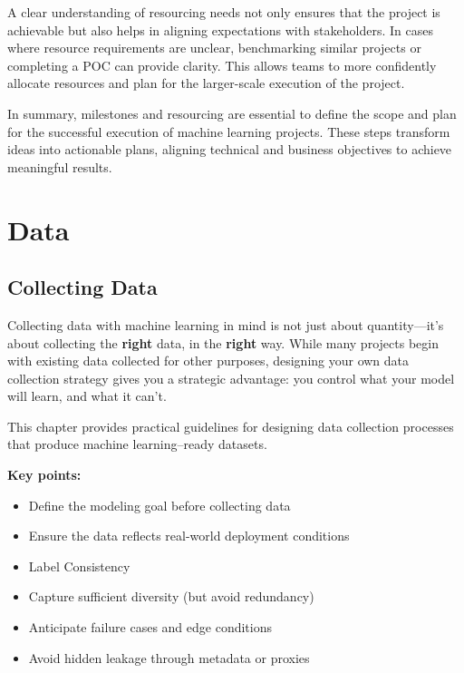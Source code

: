 \documentclass[12pt,openany, draft]{book}
\begin{document}
A clear understanding of resourcing needs not only ensures that the project is achievable but also helps in aligning expectations with stakeholders. In cases where resource requirements are unclear, benchmarking similar projects or completing a POC can provide clarity. This allows teams to more confidently allocate resources and plan for the larger-scale execution of the project. \newline

In summary, milestones and resourcing are essential to define the scope and plan for the successful execution of machine learning projects. These steps transform ideas into actionable plans, aligning technical and business objectives to achieve meaningful results.




\part{Data}


\chapter{Collecting Data}

Collecting data with machine learning in mind is not just about quantity—it's about collecting the \textbf{right} data, in the \textbf{right} way. While many projects begin with existing data collected for other purposes, designing your own data collection strategy gives you a strategic advantage: you control what your model will learn, and what it can’t.
\newline

This chapter provides practical guidelines for designing data collection processes that produce machine learning–ready datasets.

\textbf{Key points:}
\begin{itemize}
    \item Define the modeling goal before collecting data
    \item Ensure the data reflects real-world deployment conditions
    \item Label Consistency
    \item Capture sufficient diversity (but avoid redundancy)
    \item Anticipate failure cases and edge conditions
    \item Avoid hidden leakage through metadata or proxies
\end{itemize}
\end{document}

